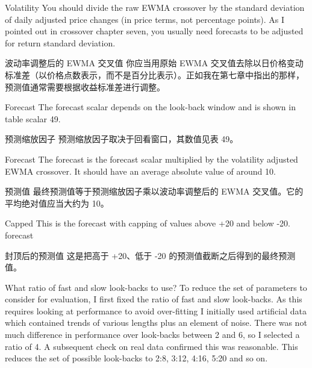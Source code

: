 \bipairgap

\begin{englishblock} Volatility You should divide the raw EWMA crossover by the standard deviation of daily adjusted price changes (in price terms, not percentage points). As I pointed out in crossover chapter seven, you usually need forecasts to be adjusted for return standard deviation. \end{englishblock}

\begin{chineseblock}波动率调整后的 EWMA 交叉值 你应当用原始 EWMA 交叉值去除以日价格变动标准差（以价格点数表示，而不是百分比表示）。正如我在第七章中指出的那样，预测值通常需要根据收益标准差进行调整。\end{chineseblock}

\bipairgap

\begin{englishblock} Forecast The forecast scalar depends on the look-back window and is shown in table scalar 49. \end{englishblock}

\begin{chineseblock}预测缩放因子 预测缩放因子取决于回看窗口，其数值见表 49。 \end{chineseblock}

\bipairgap

\begin{englishblock} Forecast The forecast is the forecast scalar multiplied by the volatility adjusted EWMA crossover. It should have an average absolute value of around 10. \end{englishblock}

\begin{chineseblock}预测值 最终预测值等于预测缩放因子乘以波动率调整后的 EWMA 交叉值。它的平均绝对值应当大约为 10。 \end{chineseblock}

\bipairgap

\begin{englishblock} Capped This is the forecast with capping of values above +20 and below -20. forecast \end{englishblock}

\begin{chineseblock}封顶后的预测值 这是把高于 +20、低于 -20 的预测值截断之后得到的最终预测值。\end{chineseblock}

\bipairgap

\begin{englishblock} What ratio of fast and slow look-backs to use? To reduce the set of parameters to consider for evaluation, I first fixed the ratio of fast and slow look-backs. As this requires looking at performance to avoid over-fitting I initially used artificial data which contained trends of various lengths plus an element of noise. There was not much difference in performance over look-backs between 2 and 6, so I selected a ratio of 4. A subsequent check on real data confirmed this was reasonable. This reduces the set of possible look-backs to 2:8, 3:12, 4:16, 5:20 and so on. \end{englishblock}

